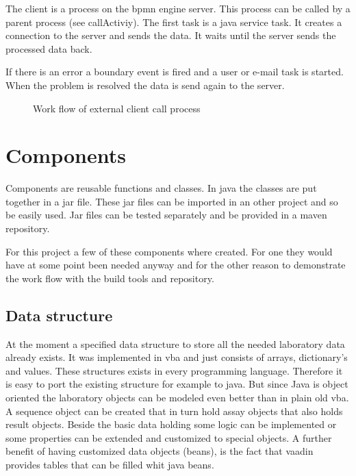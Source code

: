 \documentclass[paper=a4,twoside=false,BCOR=0mm,DIV=calc,fontsize=12pt]{scrartcl}
\begin{document}
The client is a process on the bpmn engine server. This process can be called by a parent process (see callActiviy). 
The first task is a java service task. It creates a connection to the server and sends the data. 
It waits until the server sends the processed data back.

If there is an error a boundary event is fired and a user or e-mail task is started. When the problem is resolved the 
data is send again to the server.


\begin{figure}
    \begin{center}
    \end{center}
  \caption{Work flow of external client call process}
  \label{externClientWorkflow}
\end{figure} 



\section{Components}
Components are reusable functions and classes. In java the classes are put together in a jar file. These jar files can be imported in an other project and so be easily used.
Jar files can be tested separately and be provided in a maven repository.

For this project a few of these components where created. For one they would have at some point been needed anyway and for the other reason to
demonstrate the work flow with the build tools and repository.





\subsection{Data structure}
At the moment a specified data structure to store all the needed laboratory data already exists. It was implemented in vba and just consists of
arrays, dictionary's and values. These structures exists in every programming language. Therefore it is easy to port the existing structure for
example to java. But since Java is object oriented the laboratory objects can be modeled even better than in plain old vba. A sequence object can be
created that in turn hold assay objects that also holds result objects. Beside the basic data holding some logic can be implemented or some properties
can be extended and customized to special objects. A further benefit of having customized data objects (beans), is the fact that vaadin provides
tables that can be filled whit java beans.
\end{document}
